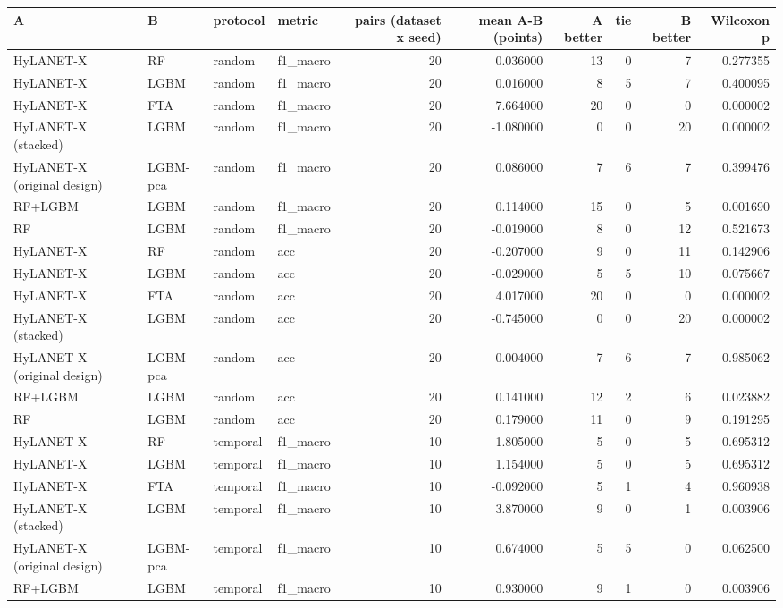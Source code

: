 \begin{tabular}{llllrrrrrr}
\toprule
A & B & protocol & metric & pairs (dataset x seed) & mean A-B (points) & A better & tie & B better & Wilcoxon p \\
\midrule
HyLANET-X & RF & random & f1\_macro & 20 & 0.036000 & 13 & 0 & 7 & 0.277355 \\
HyLANET-X & LGBM & random & f1\_macro & 20 & 0.016000 & 8 & 5 & 7 & 0.400095 \\
HyLANET-X & FTA & random & f1\_macro & 20 & 7.664000 & 20 & 0 & 0 & 0.000002 \\
HyLANET-X (stacked) & LGBM & random & f1\_macro & 20 & -1.080000 & 0 & 0 & 20 & 0.000002 \\
HyLANET-X (original design) & LGBM-pca & random & f1\_macro & 20 & 0.086000 & 7 & 6 & 7 & 0.399476 \\
RF+LGBM & LGBM & random & f1\_macro & 20 & 0.114000 & 15 & 0 & 5 & 0.001690 \\
RF & LGBM & random & f1\_macro & 20 & -0.019000 & 8 & 0 & 12 & 0.521673 \\
HyLANET-X & RF & random & acc & 20 & -0.207000 & 9 & 0 & 11 & 0.142906 \\
HyLANET-X & LGBM & random & acc & 20 & -0.029000 & 5 & 5 & 10 & 0.075667 \\
HyLANET-X & FTA & random & acc & 20 & 4.017000 & 20 & 0 & 0 & 0.000002 \\
HyLANET-X (stacked) & LGBM & random & acc & 20 & -0.745000 & 0 & 0 & 20 & 0.000002 \\
HyLANET-X (original design) & LGBM-pca & random & acc & 20 & -0.004000 & 7 & 6 & 7 & 0.985062 \\
RF+LGBM & LGBM & random & acc & 20 & 0.141000 & 12 & 2 & 6 & 0.023882 \\
RF & LGBM & random & acc & 20 & 0.179000 & 11 & 0 & 9 & 0.191295 \\
HyLANET-X & RF & temporal & f1\_macro & 10 & 1.805000 & 5 & 0 & 5 & 0.695312 \\
HyLANET-X & LGBM & temporal & f1\_macro & 10 & 1.154000 & 5 & 0 & 5 & 0.695312 \\
HyLANET-X & FTA & temporal & f1\_macro & 10 & -0.092000 & 5 & 1 & 4 & 0.960938 \\
HyLANET-X (stacked) & LGBM & temporal & f1\_macro & 10 & 3.870000 & 9 & 0 & 1 & 0.003906 \\
HyLANET-X (original design) & LGBM-pca & temporal & f1\_macro & 10 & 0.674000 & 5 & 5 & 0 & 0.062500 \\
RF+LGBM & LGBM & temporal & f1\_macro & 10 & 0.930000 & 9 & 1 & 0 & 0.003906 \\

\end{tabular}
